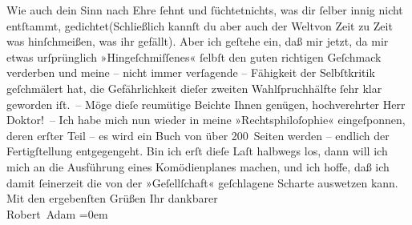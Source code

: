 \begin{ledgroupsized}[t]{13cm}
           \stanza{}{\pb}Wie auch dein Sinn nach Ehre
                            ſehnt und ſüchtet\newverse{}nichts, was dir ſelber innig
                            nicht entſtammt, gedichtet\newverse{}(Schließlich kannſt du aber
                            auch der Welt\newverse{}von Zeit zu Zeit was
                            hinſchmeißen, was ihr gefällt).\stanzaend{}\pstart
           Aber ich geſtehe ein, daß mir jetzt, da mir etwas urſprünglich »Hingeſchmiſſenes«
                    ſelbſt den guten richtigen Geſchmack verderben und meine – nicht immer
                    verſagende – Fähigkeit der Selbſtkritik geſchmälert hat, die Gefährlichkeit
                    dieſer zweiten Wahlſpruchhälfte ſehr klar geworden iſt. –\pend
           \pstart
           Möge dieſe reumütige Beichte Ihnen genügen, hochverehrter Herr Doktor! –\pend
           \pstart
           Ich habe mich nun wieder in meine »Rechtsphiloſophie« eingeſponnen, deren erſter Teil – es wird ein Buch
                    von über 200 Seiten werden – endlich der Fertigſtellung entgegengeht. Bin ich
                    erſt dieſe Laſt halbwegs los, dann will ich mich an die Ausführung eines
                    Komödienplanes machen, und ich hoffe, daß ich damit ſeinerzeit die von der »Geſellſchaft« geſchlagene Scharte auswetzen
                    kann.\pend
           \pstart
           Mit den ergebenſten Grüßen Ihr\pend
           \pstart
           dankbarer{\\[\baselineskip]}\spacefill\mbox{Robert Adam}\pend
           \leftskip=0em{}
         
         \endnumbering{}\end{ledgroupsized}  \newcommand{\dateiname}{L02215}\newcommand{\titel}{Robert Adam an Arthur Schnitzler, 16. 7. 1915}\newcommand{\editorInnen}{Martin Anton Müller und Gerd-Hermann Susen}
      